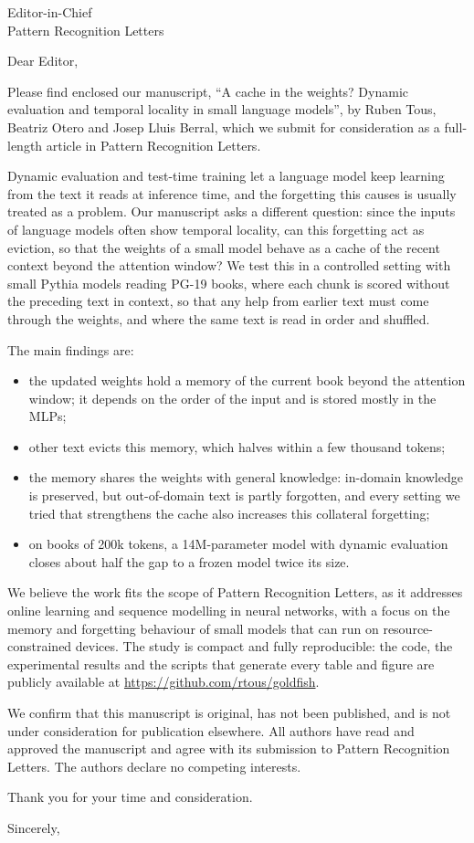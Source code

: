 \documentclass[10pt]{letter}
\date{\today}
\begin{document}
\begin{letter}{Editor-in-Chief\\Pattern Recognition Letters}

\opening{Dear Editor,}

Please find enclosed our manuscript, ``A cache in the weights? Dynamic evaluation and temporal locality in small language models'', by Ruben Tous, Beatriz Otero and Josep Lluis Berral, which we submit for consideration as a full-length article in Pattern Recognition Letters.

Dynamic evaluation and test-time training let a language model keep learning from the text it reads at inference time, and the forgetting this causes is usually treated as a problem. Our manuscript asks a different question: since the inputs of language models often show temporal locality, can this forgetting act as eviction, so that the weights of a small model behave as a cache of the recent context beyond the attention window? We test this in a controlled setting with small Pythia models reading PG-19 books, where each chunk is scored without the preceding text in context, so that any help from earlier text must come through the weights, and where the same text is read in order and shuffled.

The main findings are:
\begin{itemize}
\item the updated weights hold a memory of the current book beyond the attention window; it depends on the order of the input and is stored mostly in the MLPs;
\item other text evicts this memory, which halves within a few thousand tokens;
\item the memory shares the weights with general knowledge: in-domain knowledge is preserved, but out-of-domain text is partly forgotten, and every setting we tried that strengthens the cache also increases this collateral forgetting;
\item on books of 200k tokens, a 14M-parameter model with dynamic evaluation closes about half the gap to a frozen model twice its size.
\end{itemize}

We believe the work fits the scope of Pattern Recognition Letters, as it addresses online learning and sequence modelling in neural networks, with a focus on the memory and forgetting behaviour of small models that can run on resource-constrained devices. The study is compact and fully reproducible: the code, the experimental results and the scripts that generate every table and figure are publicly available at \url{https://github.com/rtous/goldfish}.

We confirm that this manuscript is original, has not been published, and is not under consideration for publication elsewhere. All authors have read and approved the manuscript and agree with its submission to Pattern Recognition Letters. The authors declare no competing interests.

Thank you for your time and consideration.

\closing{Sincerely,}

\end{letter}
\end{document}
